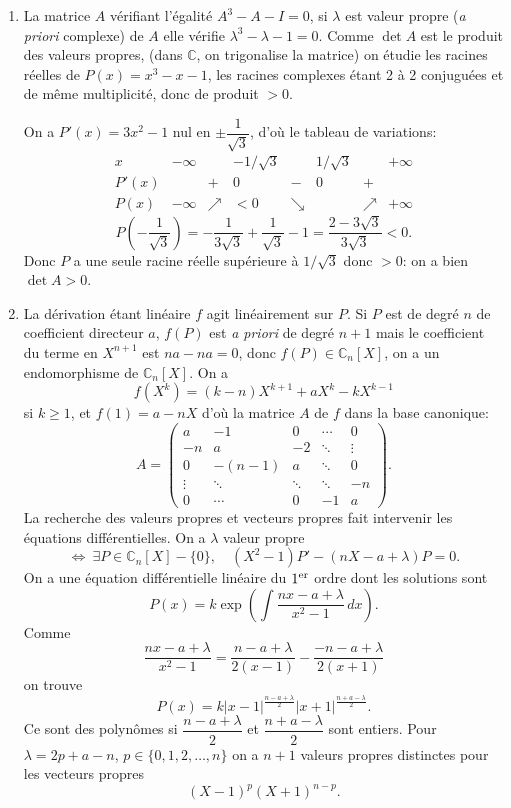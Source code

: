 \begin{enumerate}[label=\arabic*.,leftmargin=2.2em,itemsep=1.1em]

\item La matrice $A$ vérifiant l'égalité $A^3-A-I=0$, si $\lambda$ est valeur propre (\emph{a priori} complexe) de $A$ elle vérifie $\lambda^3-\lambda-1=0$. Comme $\det A$ est le produit des valeurs propres, (dans $\mathbb C$, on trigonalise la matrice) on étudie les racines réelles de $P(x)=x^3-x-1$, les racines complexes étant 2 à 2 conjuguées et de même multiplicité, donc de produit $>0$.

On a $P'(x)=3x^2-1$ nul en $\pm\dfrac1{\sqrt3}$, d'où le tableau de variations:
\[
\begin{array}{c|ccccccc}
x&-\infty&&-1/\sqrt3&&1/\sqrt3&&+\infty\\ \hline
P'(x)&&+&0&-&0&+&\\ \hline
P(x)&-\infty&\nearrow&<0&\searrow&&\nearrow&+\infty
\end{array}
\]
\[
P\!\left(-\frac1{\sqrt3}\right)
=-\frac1{3\sqrt3}+\frac1{\sqrt3}-1
=\frac{2-3\sqrt3}{3\sqrt3}<0.
\]
Donc $P$ a une seule racine réelle supérieure à $1/\sqrt3$ donc $>0$: on a bien $\det A>0$.

\item La dérivation étant linéaire $f$ agit linéairement sur $P$. Si $P$ est de degré $n$ de coefficient directeur $a$, $f(P)$ est \emph{a priori} de degré $n+1$ mais le coefficient du terme en $X^{n+1}$ est $na-na=0$, donc $f(P)\in\mathbb C_n[X]$, on a un endomorphisme de $\mathbb C_n[X]$. On a
\[
f(X^k)=(k-n)X^{k+1}+aX^k-kX^{k-1}
\]
si $k\ge1$, et $f(1)=a-nX$ d'où la matrice $A$ de $f$ dans la base canonique:
\[
A=\begin{pmatrix}
a&-1&0&\cdots&0\\
-n&a&-2&\ddots&\vdots\\
0&-(n-1)&a&\ddots&0\\
\vdots&\ddots&\ddots&\ddots&-n\\
0&\cdots&0&-1&a
\end{pmatrix}.
\]
La recherche des valeurs propres et vecteurs propres fait intervenir les équations différentielles. On a $\lambda$ valeur propre
\[
\Longleftrightarrow\ \exists P\in\mathbb C_n[X]-\{0\},\quad
(X^2-1)P'-(nX-a+\lambda)P=0.
\]
On a une équation différentielle linéaire du $1^{\rm er}$ ordre dont les solutions sont
\[
P(x)=k\exp\left(\int\frac{nx-a+\lambda}{x^2-1}\,dx\right).
\]
Comme
\[
\frac{nx-a+\lambda}{x^2-1}
=\frac{n-a+\lambda}{2(x-1)}-\frac{-n-a+\lambda}{2(x+1)}
\]
on trouve
\[
P(x)=k|x-1|^{\frac{n-a+\lambda}{2}}|x+1|^{\frac{n+a-\lambda}{2}}.
\]
Ce sont des polynômes si $\dfrac{n-a+\lambda}{2}$ et $\dfrac{n+a-\lambda}{2}$ sont entiers. Pour $\lambda=2p+a-n$, $p\in\{0,1,2,\ldots,n\}$ on a $n+1$ valeurs propres distinctes pour les vecteurs propres
\[
(X-1)^p(X+1)^{n-p}.
\]


\end{enumerate}
